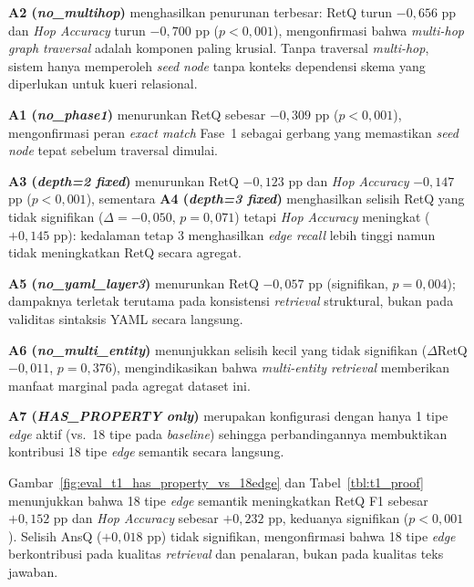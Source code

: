 

\textbf{A2 (\textit{no\_multihop})} menghasilkan penurunan terbesar: RetQ turun $-0{,}656$ pp dan \textit{Hop Accuracy} turun $-0{,}700$ pp ($p{<}0{,}001$), mengonfirmasi bahwa \textit{multi-hop graph traversal} adalah komponen paling krusial. Tanpa traversal \textit{multi-hop}, sistem hanya memperoleh \textit{seed node} tanpa konteks dependensi skema yang diperlukan untuk kueri relasional.

\textbf{A1 (\textit{no\_phase1})} menurunkan RetQ sebesar $-0{,}309$ pp ($p{<}0{,}001$), mengonfirmasi peran \textit{exact match} Fase~1 sebagai gerbang yang memastikan \textit{seed node} tepat sebelum traversal dimulai.

\textbf{A3 (\textit{depth=2 fixed})} menurunkan RetQ $-0{,}123$ pp dan \textit{Hop Accuracy} $-0{,}147$ pp ($p{<}0{,}001$), sementara \textbf{A4 (\textit{depth=3 fixed})} menghasilkan selisih RetQ yang tidak signifikan ($\Delta{=}{-}0{,}050$, $p{=}0{,}071$) tetapi \textit{Hop Accuracy} meningkat ($+0{,}145$ pp): kedalaman tetap 3 menghasilkan \textit{edge recall} lebih tinggi namun tidak meningkatkan RetQ secara agregat.

\textbf{A5 (\textit{no\_yaml\_layer3})} menurunkan RetQ $-0{,}057$ pp (signifikan, $p{=}0{,}004$); dampaknya terletak terutama pada konsistensi \textit{retrieval} struktural, bukan pada validitas sintaksis YAML secara langsung.

\begin{sloppypar}
\textbf{A6 (\textit{no\_\allowbreak{}multi\_\allowbreak{}entity})} menunjukkan selisih kecil yang tidak signifikan ($\Delta$RetQ $-0{,}011$, $p{=}0{,}376$), mengindikasikan bahwa \textit{multi-entity retrieval} memberikan manfaat marginal pada agregat dataset ini.
\end{sloppypar}

\begin{sloppypar}
\textbf{A7 (\textit{HAS\_\allowbreak{}PROPERTY only})} merupakan konfigurasi dengan hanya 1 tipe \textit{edge} aktif (vs.\ 18 tipe pada \textit{baseline}) sehingga perbandingannya membuktikan kontribusi 18 tipe \textit{edge} semantik secara langsung.
\end{sloppypar} Gambar~\ref{fig:eval_t1_has_property_vs_18edge} dan Tabel~\ref{tbl:t1_proof} menunjukkan bahwa 18 tipe \textit{edge} semantik meningkatkan RetQ F1 sebesar $+0{,}152$ pp dan \textit{Hop Accuracy} sebesar $+0{,}232$ pp, keduanya signifikan ($p{<}0{,}001$). Selisih AnsQ ($+0{,}018$ pp) tidak signifikan, mengonfirmasi bahwa 18 tipe \textit{edge} berkontribusi pada kualitas \textit{retrieval} dan penalaran, bukan pada kualitas teks jawaban.

